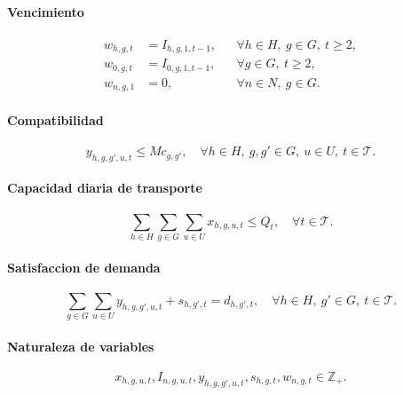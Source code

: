 \paragraph{Vencimiento}
\begin{align}
w_{h,g,t} &= I_{h,g,1,t-1},
&& \forall h \in H,\ g \in G,\ t \geq 2, \\
w_{0,g,t} &= I_{0,g,1,t-1},
&& \forall g \in G,\ t \geq 2, \\
w_{n,g,1} &= 0,
&& \forall n \in N,\ g \in G.
\end{align}

\paragraph{Compatibilidad}
\begin{equation}
y_{h,g,g',u,t} \leq M c_{g,g'},
\quad \forall h \in H,\ g,g' \in G,\ u \in U,\ t \in \mathcal{T}.
\end{equation}

\paragraph{Capacidad diaria de transporte}
\begin{equation}
\sum_{h \in H} \sum_{g \in G} \sum_{u \in U} x_{h,g,u,t}
\leq Q_t,
\quad \forall t \in \mathcal{T}.
\end{equation}

\paragraph{Satisfaccion de demanda}
\begin{equation}
\sum_{g \in G} \sum_{u \in U} y_{h,g,g',u,t}
+ s_{h,g',t}
= d_{h,g',t},
\quad \forall h \in H,\ g' \in G,\ t \in \mathcal{T}.
\end{equation}

\paragraph{Naturaleza de variables}
\begin{equation}
x_{h,g,u,t}, I_{n,g,u,t}, y_{h,g,g',u,t}, s_{h,g,t}, w_{n,g,t} \in \mathbb{Z}_{+}.
\end{equation}
